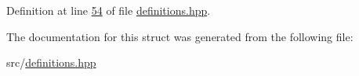 Definition at line \hyperlink{definitions_8hpp_source_l00054}{54} of file \hyperlink{definitions_8hpp_source}{definitions.\+hpp}.



The documentation for this struct was generated from the following file\+:\begin{DoxyCompactItemize}
\item 
src/\hyperlink{definitions_8hpp}{definitions.\+hpp}\end{DoxyCompactItemize}
